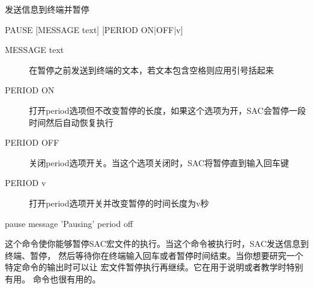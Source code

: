 \label{cmd:pause}

发送信息到终端并暂停

\begin{SACSTX}
PAUSE [MESSAGE text] [PERIOD ON|OFF|v]
\end{SACSTX}

\begin{description}
\item [MESSAGE text] 在暂停之前发送到终端的文本，若文本包含空格则应用引号括起来
\item [PERIOD ON] 打开period选项但不改变暂停的长度，如果这个选项为开，SAC会暂停一段时间然后自动恢复执行
\item [PERIOD OFF] 关闭period选项开关。当这个选项关闭时，SAC将暂停直到输入回车键
\item [PERIOD v] 打开period选项开关并改变暂停的时间长度为v秒
\end{description}

\begin{SACDFT}
pause message 'Pausing' period off
\end{SACDFT}

这个命令使你能够暂停SAC宏文件的执行。当这个命令被执行时，SAC发送信息到终端、暂停，
然后等待你在终端输入回车或者暂停时间结束。当你想要研究一个特定命令的输出时可以让
宏文件暂停执行再继续。它在用于说明或者教学时特别有用。 命令也很有用的。
